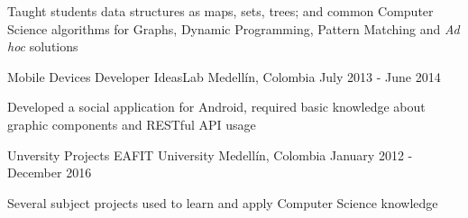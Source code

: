 \begin{cventries}
{\begin{cvitems}
        \item {Taught students data structures as maps, sets, trees; and common Computer Science
               algorithms for Graphs, Dynamic Programming, Pattern Matching and \textit{Ad hoc}
               solutions}
      \end{cvitems}
    }
  \cventry
    {Mobile Devices Developer}
    {IdeasLab}
    {Medellín, Colombia}
    {July 2013 - June 2014}
    {
      \begin{cvitems}
        \item {Developed a social application for Android, required basic knowledge about graphic
               components and RESTful API usage}
      \end{cvitems}
      \begin{cvsubentries}
      \end{cvsubentries}
    }
    \cventry
      {Unversity Projects}
      {EAFIT University}
      {Medellín, Colombia}
      {January 2012 - December 2016}
      {
        \begin{cvitems}
          \item {Several subject projects used to learn and apply Computer Science knowledge}
        \end{cvitems}
        \begin{cvsubentries}
        \end{cvsubentries}
      }
\end{cventries}
